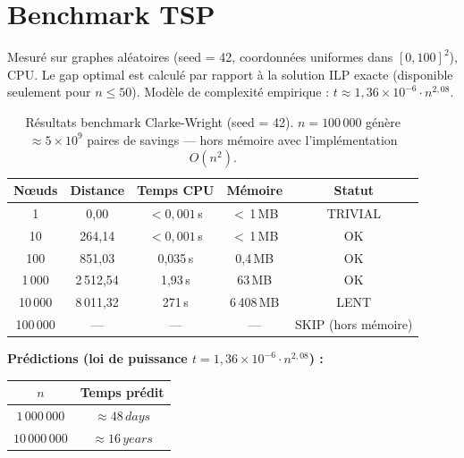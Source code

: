 \documentclass[12pt, a4paper]{article}
\begin{document}
\section{Benchmark TSP}

Mesuré sur graphes aléatoires (seed = 42, coordonnées uniformes dans $[0,100]^2$), CPU.
Le gap optimal est calculé par rapport à la solution ILP exacte (disponible seulement pour $n \leq 50$).
Modèle de complexité empirique : $t \approx 1{,}36 \times 10^{-6} \cdot n^{2{,}08}$.

\begin{table}[h]
  \centering
  \begin{tabular}{ccccc}
    \toprule
    \textbf{Nœuds} & \textbf{Distance} & \textbf{Temps CPU} & \textbf{Mémoire} & \textbf{Statut} \\
    \midrule
    1        & 0{,}00    & $< 0{,}001$\,s  & $<$\,1\,MB   & TRIVIAL  \\
    10       & 264{,}14  & $< 0{,}001$\,s  & $<$\,1\,MB   & OK       \\
    100      & 851{,}03  & 0{,}035\,s      & 0{,}4\,MB    & OK       \\
    1\,000   & 2\,512{,}54 & 1{,}93\,s     & 63\,MB       & OK       \\
    10\,000  & 8\,011{,}32 & 271\,s        & 6\,408\,MB   & LENT     \\
    100\,000 & ---       & ---             & ---          & SKIP (hors mémoire) \\
    \bottomrule
  \end{tabular}
  \caption{%
    Résultats benchmark Clarke-Wright (seed = 42).
    $n = 100\,000$ génère $\approx 5 \times 10^{9}$ paires de savings — hors mémoire avec l'implémentation $O(n^2)$.
  }
\end{table}

\medskip
\textbf{Prédictions (loi de puissance $t = 1{,}36 \times 10^{-6} \cdot n^{2{,}08}$) :}

\begin{center}
\begin{tabular}{cc}
  \toprule
  \textbf{$n$} & \textbf{Temps prédit} \\
  \midrule
  $1\,000\,000$  & $\approx 48\,days$ \\
  $10\,000\,000$ & $\approx 16\,years$ \\
  \bottomrule
\end{tabular}
\end{center}
\end{document}
